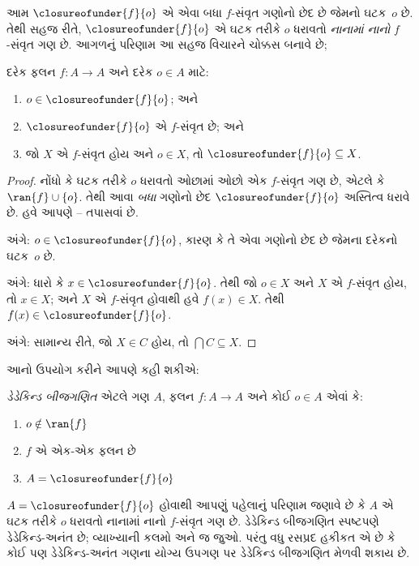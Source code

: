 આમ $\closureofunder{f}{o}$ એ એવા બધા $f$-સંવૃત ગણોનો છેદ છે
જેમનો ઘટક~$o$ છે. તેથી સહજ રીતે,
$\closureofunder{f}{o}$ એ ઘટક તરીકે $o$ ધરાવતો
\emph{નાનામાં નાનો} $f$-સંવૃત ગણ છે. આગળનું પરિણામ આ સહજ વિચારને
ચોક્કસ બનાવે છે;
\begin{lem}
	દરેક ફલન $f \colon A \to A$ અને દરેક $o \in A$ માટે:
	\begin{enumerate}
		\item{} $o \in \closureofunder{f}{o}$; અને
		\item{} $\closureofunder{f}{o}$ એ $f$-સંવૃત છે; અને
		\item{} જો $X$ એ $f$-સંવૃત હોય અને $o \in
		X$, તો $\closureofunder{f}{o} \subseteq X$.
	\end{enumerate}
\end{lem}

\begin{proof}
નોંધો કે ઘટક તરીકે $o$ ધરાવતો ઓછામાં ઓછો એક $f$-સંવૃત ગણ
છે, એટલે કે $\ran{f}\cup \{o\}$. તેથી આવા \emph{બધા} ગણોનો છેદ
$\closureofunder{f}{o}$ અસ્તિત્વ ધરાવે છે. હવે આપણે
-- તપાસવાં છે.

 અંગે: $o \in \closureofunder{f}{o}$, કારણ કે
તે એવા ગણોનો છેદ છે જેમના દરેકનો ઘટક~$o$ છે.

 અંગે: ધારો કે $x \in \closureofunder{f}{o}$.
તેથી જો $o \in X$ અને $X$ એ $f$-સંવૃત હોય, તો $x \in X$; અને
$X$ એ $f$-સંવૃત હોવાથી હવે $f(x) \in X$. તેથી
$f(x) \in \closureofunder{f}{o}$.

 અંગે: સામાન્ય રીતે, જો $X \in C$ હોય, તો
$\bigcap C \subseteq X$.
\end{proof}

આનો ઉપયોગ કરીને આપણે કહી શકીએ:

\begin{defn}
\emph{ડેડેકિન્ડ બીજગણિત} એટલે ગણ $A$, ફલન $f \colon A \to A$
અને કોઈ $o \in A$ એવાં કે:
	\begin{enumerate}
		\item {} $o \notin \ran{f}$
		\item {} $f$ એ એક-એક ફલન છે
		\item {} $A = \closureofunder{f}{o}$
	\end{enumerate}
\end{defn}

$A = \closureofunder{f}{o}$ હોવાથી આપણું પહેલાનું પરિણામ જણાવે છે કે
$A$ એ ઘટક તરીકે $o$ ધરાવતો નાનામાં નાનો $f$-સંવૃત ગણ છે.
ડેડેકિન્ડ બીજગણિત સ્પષ્ટપણે ડેડેકિન્ડ-અનંત છે; વ્યાખ્યાની કલમો
 અને  જ જુઓ. પરંતુ વધુ રસપ્રદ
હકીકત એ છે કે કોઈ પણ ડેડેકિન્ડ-અનંત ગણના યોગ્ય ઉપગણ પર ડેડેકિન્ડ બીજગણિત મેળવી
શકાય છે.


